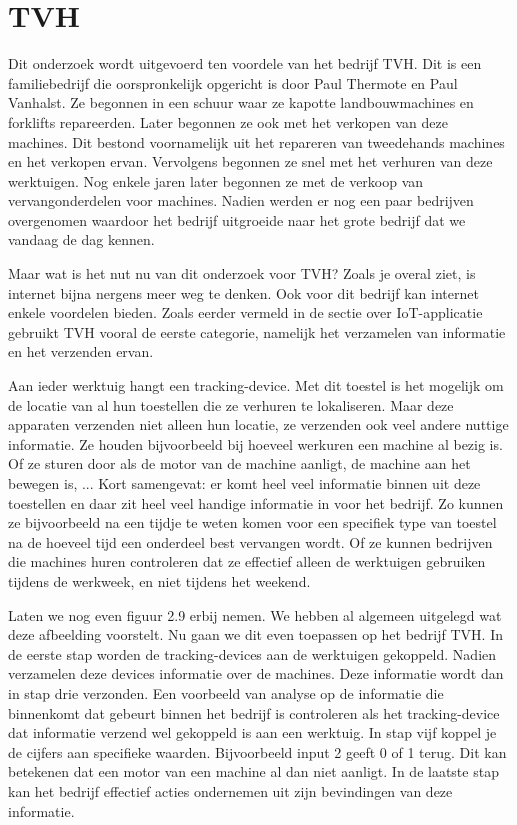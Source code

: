 \section{TVH}
Dit onderzoek wordt uitgevoerd ten voordele van het bedrijf TVH. Dit is een familiebedrijf die oorspronkelijk opgericht is door Paul Thermote en Paul Vanhalst. Ze begonnen in een schuur waar ze kapotte landbouwmachines en forklifts repareerden. Later begonnen ze ook met het verkopen van deze machines. Dit bestond voornamelijk uit het repareren van tweedehands machines en het verkopen ervan. Vervolgens begonnen ze snel met het verhuren van deze werktuigen. Nog enkele jaren later begonnen ze met de verkoop van vervangonderdelen voor machines. Nadien werden er nog een paar bedrijven overgenomen waardoor het bedrijf uitgroeide naar het grote bedrijf dat we vandaag de dag kennen. 

Maar wat is het nut nu van dit onderzoek voor TVH? Zoals je overal ziet, is internet bijna nergens meer weg te denken. Ook voor dit bedrijf kan internet enkele voordelen bieden. Zoals eerder vermeld in de sectie over IoT-applicatie gebruikt TVH vooral de eerste categorie, namelijk het verzamelen van informatie en het verzenden ervan.

Aan ieder werktuig hangt een tracking-device. Met dit toestel is het mogelijk om de locatie van al hun toestellen die ze verhuren te lokaliseren. Maar deze apparaten verzenden niet alleen hun locatie, ze verzenden ook veel andere nuttige informatie. Ze houden bijvoorbeeld bij hoeveel werkuren een machine al bezig is. Of ze sturen door als de motor van de machine aanligt, de machine aan het bewegen is, ... Kort samengevat: er komt heel veel informatie binnen uit deze toestellen en daar zit heel veel handige informatie in voor het bedrijf. Zo kunnen ze bijvoorbeeld na een tijdje te weten komen voor een specifiek type van toestel na de hoeveel tijd een onderdeel best vervangen wordt. Of ze kunnen bedrijven die machines huren controleren dat ze effectief alleen de werktuigen gebruiken tijdens de werkweek, en niet tijdens het weekend.

Laten we nog even figuur 2.9 erbij nemen. We hebben al algemeen uitgelegd wat deze afbeelding voorstelt. Nu gaan we dit even toepassen op het bedrijf TVH. In de eerste stap worden de tracking-devices aan de werktuigen gekoppeld. Nadien verzamelen deze devices informatie over de machines. Deze informatie wordt dan in stap drie verzonden. Een voorbeeld van analyse op de informatie die binnenkomt dat gebeurt binnen het bedrijf is controleren als het tracking-device dat informatie verzend wel gekoppeld is aan een werktuig. In stap vijf koppel je de cijfers aan specifieke waarden. Bijvoorbeeld input 2 geeft 0 of 1 terug. Dit kan betekenen dat een motor van een machine al dan niet aanligt. In de laatste stap kan het bedrijf effectief acties ondernemen uit zijn bevindingen van deze informatie.

